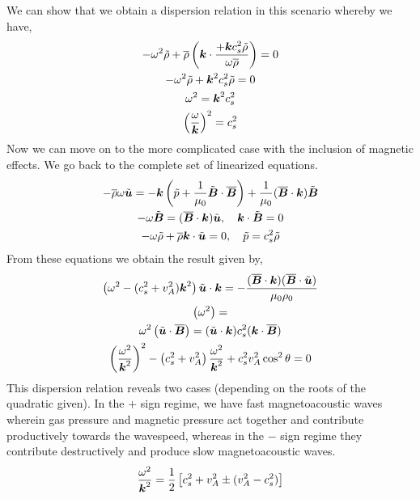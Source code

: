 \documentclass{article}
\begin{document}
We can show that we obtain a dispersion relation in this scenario whereby we
have, 
\begin{gather*}
    -\omega^2\tilde{\rho} + \overline{\rho}\left(\boldsymbol{k} \cdot
    \frac{+\boldsymbol{k}c_s^2\tilde{\rho}}{\omega\overline{\rho}}\right) = 0\\
    -\omega^2\tilde{\rho} + \boldsymbol{k}^2c_s^2\tilde{\rho}= 0\\
    \omega^2 =  \boldsymbol{k}^2c_s^2\\
    \left(\frac{\omega}{\boldsymbol{k}}\right)^2 = c_s^2
\end{gather*}
Now we can move on to the more complicated case with the inclusion of magnetic
effects. We go back to the complete set of linearized equations. 
\begin{gather*}
    -\overline{\rho}\omega\tilde{\boldsymbol{u}} = -\boldsymbol{k}\left(\tilde{p} +
    \frac{1}{\mu_0}\tilde{\boldsymbol{B}}\cdot\overline{\boldsymbol{B}}\right) +
    \frac{1}{\mu_0}(\overline{\boldsymbol{B}}\cdot\boldsymbol{k})\tilde{\boldsymbol{B}}\\
    -\omega\tilde{\boldsymbol{B}} = (\overline{\boldsymbol{B}}\cdot\boldsymbol{k})\tilde{\boldsymbol{u}}, \quad
    \boldsymbol{k}\cdot\tilde{\boldsymbol{B}} = 0\\
    -\omega\tilde{\rho} + \overline{\rho}\boldsymbol{k}\cdot\tilde{\boldsymbol{u}} = 0, \quad \tilde{p} = c_s^2\tilde{\rho} 
\end{gather*}
From these equations we obtain the result given by, 
\begin{gather*}
    \left(\omega^2 - (c_s^2 + v_A^2)\boldsymbol{k}^2\right)\tilde{\boldsymbol{u}}\cdot\boldsymbol{k} = -
    \frac{(\overline{\boldsymbol{B}}\cdot\boldsymbol{k})(\overline{\boldsymbol{B}}\cdot\tilde{\boldsymbol{u}})}{\mu_0\rho_0}\\
    \left(\omega^2 \right) = \\
    \omega^2\left(\tilde{\boldsymbol{u}}\cdot\overline{\boldsymbol{B}}\right) =
    (\tilde{\boldsymbol{u}}\cdot\boldsymbol{k})c_s^2(\boldsymbol{k}\cdot\overline{\boldsymbol{B}})\\
    \left(\frac{\omega^2}{\boldsymbol{k}^2}\right)^2 -
    \left(c_s^2+v_A^2\right)\frac{\omega^2}{\boldsymbol{k}^2} + c_s^2v_A^2\cos^2\theta =
    0
\end{gather*}
This dispersion relation reveals two cases (depending on the roots of the
quadratic given). In the $+$ sign regime, we have fast magnetoacoustic waves
wherein gas pressure and magnetic pressure act together and contribute
productively towards the wavespeed, whereas in the $-$ sign regime they
contribute destructively and produce slow magnetoacoustic waves. 
\begin{gather*}
    \frac{\omega^2}{\boldsymbol{k}^2} = \frac{1}{2}\left[c_s^2 + v_A^2 \pm (v_A^2 - c_s^2)\right]
\end{gather*}
\end{document}
